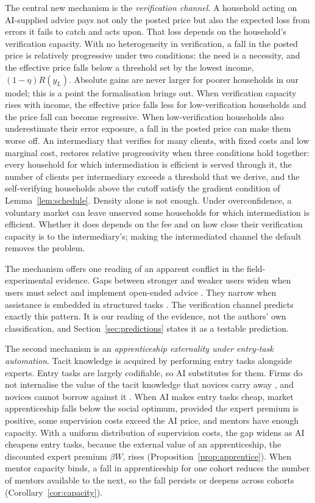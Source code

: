 \documentclass[12pt]{article}
\theoremstyle{remark}
\begin{document}
The central new mechanism is the \emph{verification channel}. A household acting on AI-supplied advice pays not only the posted price but also the expected loss from errors it fails to catch and acts upon. That loss depends on the household's verification capacity. With no heterogeneity in verification, a fall in the posted price is relatively progressive under two conditions: the need is a necessity, and the effective price falls below a threshold set by the lowest income, $(1-\eta)R(y_L)$. Absolute gains are never larger for poorer households in our model; this is a point the formalisation brings out. When verification capacity rises with income, the effective price falls less for low-verification households and the price fall can become regressive. When low-verification households also underestimate their error exposure, a fall in the posted price can make them worse off. An intermediary that verifies for many clients, with fixed costs and low marginal cost, restores relative progressivity when three conditions hold together: every household for which intermediation is efficient is served through it, the number of clients per intermediary exceeds a threshold that we derive, and the self-verifying households above the cutoff satisfy the gradient condition of Lemma~\ref{lem:schedule}. Density alone is not enough. Under overconfidence, a voluntary market can leave unserved some households for which intermediation is efficient. Whether it does depends on the fee and on how close their verification capacity is to the intermediary's; making the intermediated channel the default removes the problem.

The mechanism offers one reading of an apparent conflict in the field-experimental evidence. Gaps between stronger and weaker users widen when users must select and implement open-ended advice \citep{otis2026uneven}. They narrow when assistance is embedded in structured tasks \citep{brynjolfsson2025work,cruces2026narrow}. The verification channel predicts exactly this pattern. It is our reading of the evidence, not the authors' own classification, and Section~\ref{sec:predictions} states it as a testable prediction.

The second mechanism is an \emph{apprenticeship externality under entry-task automation}. Tacit knowledge is acquired by performing entry tasks alongside experts. Entry tasks are largely codifiable, so AI substitutes for them. Firms do not internalise the value of the tacit knowledge that novices carry away \citep{becker1962investment}, and novices cannot borrow against it \citep{ide2025automation}. When AI makes entry tasks cheap, market apprenticeship falls below the social optimum, provided the expert premium is positive, some supervision costs exceed the AI price, and mentors have enough capacity. With a uniform distribution of supervision costs, the gap widens as AI cheapens entry tasks, because the external value of an apprenticeship, the discounted expert premium $\beta W$, rises (Proposition~\ref{prop:apprentice}). When mentor capacity binds, a fall in apprenticeship for one cohort reduces the number of mentors available to the next, so the fall persists or deepens across cohorts (Corollary~\ref{cor:capacity}).
\end{document}
